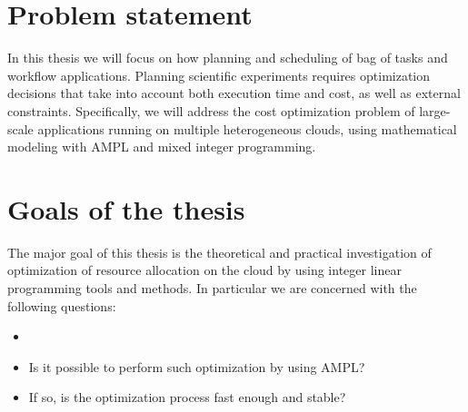 \section{Problem statement}
\label{intro:statement}

 In this thesis we will focus on how planning and scheduling of bag of tasks and workflow applications. Planning scientific experiments requires optimization decisions that take into account both execution time and cost, as well as external constraints. Specifically, we will address the cost optimization problem of large-scale applications running on multiple heterogeneous clouds, using mathematical modeling with AMPL and mixed integer programming.

\section{Goals of the thesis}
\label{intro:goals}

The major goal of this thesis is the theoretical and practical investigation of optimization of resource allocation on the cloud by using integer linear programming tools and methods. In particular we are concerned with the following questions:

\begin{itemize}
  \item 
  \item Is it possible to perform such optimization by using AMPL?
  \item If so, is the optimization process fast enough and stable?
\end{itemize}

